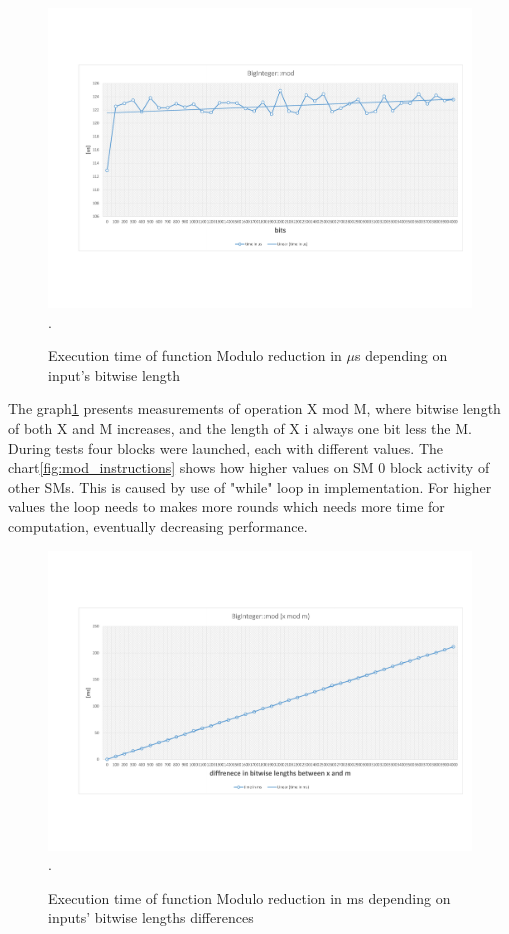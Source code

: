 \documentclass[oneside,openright,12pt,final,en]{mgr}
\begin{document}
\begin{figure}[H]
	\centering
	\includegraphics[width=\textwidth,trim={0.5cm 2.8cm 0.4cm 2.8cm},clip]{mod.pdf}.
	\caption{Execution time of function Modulo reduction in $\mu$s depending on input's bitwise length}
	\label{fig:mod}
\end{figure}

The graph\ref{fig:mod} presents measurements of operation X mod M, where bitwise length of both X and M increases, and the length of X i always one bit less the M. During tests four blocks were launched, each with different values. The chart\ref{fig:mod_instructions} shows how higher values on SM 0 block activity of other SMs. This is caused by use of "while" loop in implementation. For higher values the loop needs to makes more rounds which needs more time for computation, eventually decreasing performance. 

\begin{figure}[H]
	\centering
	\includegraphics[width=\textwidth,trim={0.5cm 2.8cm 0.4cm 2.8cm},clip]{mod_diff.pdf}.
	\caption{Execution time of function Modulo reduction in ms depending on inputs' bitwise lengths differences}
	\label{fig:mod_diff}
\end{figure}
\end{document}
